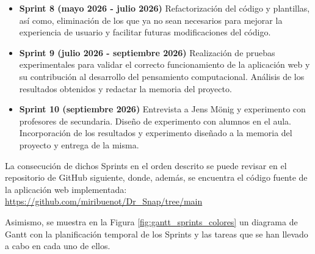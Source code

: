 \begin{itemize}
    \item \textbf{Sprint 8 (mayo 2026 - julio 2026)} Refactorización del código y plantillas, así como, eliminación de los que ya no sean necesarios para mejorar la experiencia de usuario y facilitar futuras modificaciones del código.
    \item \textbf{Sprint 9 (julio 2026 - septiembre 2026)} Realización de pruebas experimentales para validar el correcto funcionamiento de la aplicación web y su contribución al desarrollo del pensamiento computacional. Análisis de los resultados obtenidos y redactar la memoria del proyecto.
    \item \textbf{Sprint 10 (septiembre 2026)} Entrevista a Jens Mönig y experimento con profesores de secundaria. Diseño de experimento con alumnos en el aula. Incorporación de los resultados y experimento diseñado a la memoria del proyecto y entrega de la misma.
\end{itemize}

La consecución de dichos Sprints en el orden descrito se puede revisar en el repositorio de GitHub siguiente, donde, además, se encuentra el código fuente de la aplicación web implementada: \url{https://github.com/miribuenot/Dr_Snap/tree/main}

Asimismo, se muestra en la Figura \ref{fig:gantt_sprints_colores} un diagrama de Gantt con la planificación temporal de los Sprints y las tareas que se han llevado a cabo en cada uno de ellos.


